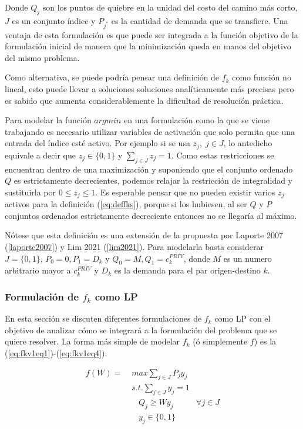 \documentclass{article}
\begin{document}
  Donde $Q_j$ son los puntos de quiebre en la unidad del costo del camino más corto, $J$ es un conjunto índice y $P_{j^*}$ es la cantidad de demanda que se transfiere. Una ventaja de esta formulación es que puede ser integrada a la función objetivo de la formulación inicial de manera que la minimización queda en manos del objetivo del mismo problema.

  Como alternativa, se puede podría pensar una definición de $f_k$ como función no lineal, esto puede llevar a soluciones soluciones analíticamente más precisas pero es sabido que aumenta considerablemente la dificultad de resolución práctica.

  Para modelar la función $argmin$ en una formulación como la que se viene trabajando es necesario utilizar variables de activación que solo permita que una entrada del índice esté activo. Por ejemplo si se usa $z_j,\; j \in J$, lo antedicho equivale a decir que $z_j \in \{0,1\}$ y $\sum_{j \in J} z_j = 1$. Como estas restricciones se encuentran dentro de una maximización y suponiendo que el conjunto ordenado $Q$ es estrictamente decrecientes, podemos relajar la restricción de integralidad y sustituirla por $0 \leq z_j \leq 1$. Es esperable pensar que no pueden existir varios $z_j$ activos para la definición (\ref{eq:deffks}), porque si los hubiesen, al ser $Q$ y $P$ conjuntos ordenados estrictamente decreciente entonces no se llegaría al máximo.

  Nótese que esta definición es una extensión de la propuesta por Laporte 2007 (\ref{laporte2007}) y Lim 2021 (\ref{lim2021}). Para modelarla basta considerar $J = \{0, 1\}$, $P_0 = 0, P_1 = D_k$ y $Q_0 = M, Q_1 = c^{PRIV}_k$, donde $M$ es un numero arbitrario mayor a $c^{PRIV}_k$ y $D_k$ es la demanda para el par origen-destino $k$.

  \subsubsection*{Formulación de $f_k$ como LP}

  En esta sección se discuten diferentes formulaciones de $f_k$ como LP con el objetivo de analizar cómo se integrará a la formulación del problema que se quiere resolver. La forma más simple de modelar $f_k$ (ó simplemente $f$) es la (\ref{eq:fkv1eq1})-(\ref{eq:fkv1eq4}).

  \begin{align}
    f(W) =\; & max \sum_{j \in J} P_j y_j    & \label{eq:fkv1eq1}\\
             & s.t. \sum_{j \in J} y_j = 1   & \label{eq:fkv1eq2} \\
             & \;\;\; Q_j \geq W y_j         & \label{eq:fkv1eq3} \forall j \in J \\
             & \;\;\; y_j \in \{0,1\}        & \label{eq:fkv1eq4}
  \end{align}
\end{document}
